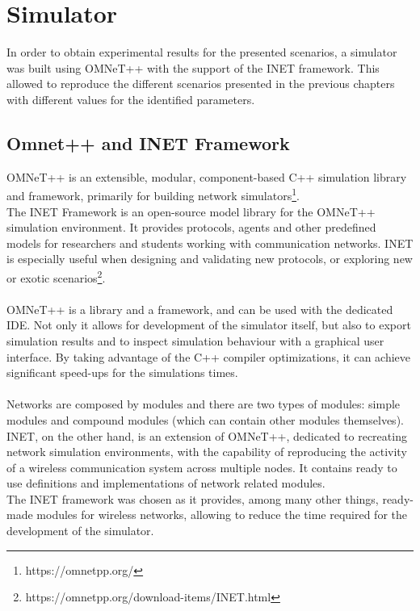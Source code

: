 %
\chapter{Simulator}\label{ch:simulator}
In order to obtain experimental results for the presented scenarios, a simulator
was built using OMNeT++ with the support of the INET framework. This allowed
to reproduce the different scenarios presented in the previous chapters with
different values for the identified parameters.\\
\section{Omnet++ and INET Framework}
OMNeT++ is an extensible, modular, component-based C++ simulation library and
framework, primarily for building network simulators\footnote{https://omnetpp.org/}.\\
The INET Framework is an open-source model library for the OMNeT++ simulation
environment. It provides protocols, agents and other predefined models for
researchers and students working with communication networks. INET is especially
useful when designing and validating new protocols, or exploring new or exotic
scenarios\footnote{https://omnetpp.org/download-items/INET.html}.\\
\\
OMNeT++ is a library and a framework, and can be used with the dedicated IDE.
Not only it allows for development of the simulator itself, but also to export
simulation results and to inspect simulation behaviour with a graphical user
interface. By taking advantage of the C++ compiler optimizations, it can achieve
significant speed-ups for the simulations times.\\
\\
Networks are composed by modules and there are two types of modules: simple
modules and compound modules (which can contain other modules themselves).
INET, on the other hand, is an extension of OMNeT++, dedicated to recreating 
network simulation environments, with the capability of reproducing the activity
of a wireless communication system across multiple nodes. It contains ready to
use definitions and implementations of network related modules.\\
The INET framework was chosen as it provides, among many other things,
ready-made modules for wireless networks, allowing to reduce the time required
for the development of the simulator.
